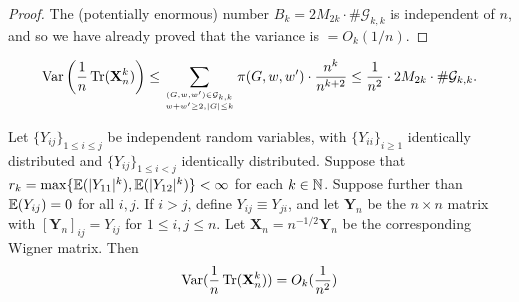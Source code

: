\begin{proof}
  \notready
  The (potentially enormous) number $B_k=2M_{2k}\cdot\#\mathcal{G}_{k,k}$ is independent of $n$, and so we have already proved that the variance is $=O_k(1/n)$.
\end{proof}


\begin{lemma}
    \label{lem:elimination_kp1}
    \notready

    \[ \operatorname{Var}\left( \frac1n\operatorname{Tr}(\mathbf{X}_n^k)\right) \le \sum_{(G,w,w')\in\mathcal{G}_{k,k}\atop w+w'\ge 2, |G| \leq k} \pi(G,w,w')\cdot \frac{n^{k}}{n^{k+2}} \le \frac{1}{n^2}\cdot 2M_{2k}\cdot \#\mathcal{G}_{k,k}. \]
\end{lemma}


\begin{proposition}
  \label{prop:matrix_moments_convergence_probability}
  \notready
  Let $\{Y_{ij}\}_{1 \leq i \leq j}$ be independent random variables, with $\{Y_{ii}\}_{i\geq 1}$ identically distributed and $\{Y_{ij}\}_{1 \leq i < j}$ identically distributed. Suppose that $r_k = \max\{\mathbb{E}(|Y_{11}|^k),\mathbb{E}(|Y_{12}|^k)\} < \infty$ for each $k\in\mathbb{N}$. Suppose further than $\mathbb{E}(Y_{ij})=0$ for all $i,j$. If $i>j$, define $Y_{ij} \equiv Y_{ji}$, and let $\mathbf{Y}_n$ be the $n\times n$ matrix with $[\mathbf{Y}_n]_{ij} = Y_{ij}$ for $1\le i,j\le n$. Let $\mathbf{X}_n = n^{-1/2}\mathbf{Y}_n$ be the corresponding Wigner matrix. Then
  $$
  \operatorname{Var}(\frac{1}{n}\operatorname{Tr}(\mathbf{X}_{n}^{k})) = O_{k}(\frac{1}{n^2})
  $$
\end{proposition}
